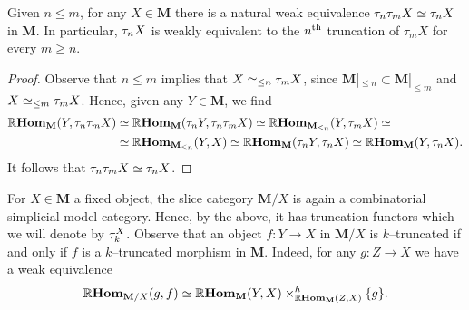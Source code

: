 \begin{corollary}
  Given \(n \leq m\), for any \(X\in\mathbf M\) there is a natural weak equivalence \(\tau_{n}\tau_{m} X \simeq \tau_{n} X\) in \(\mathbf M\). In particular, \(\tau_{n}X\) is weakly equivalent to the \(n\textsuperscript{th}\) truncation of \(\tau_{m}X\) for every \(m\geq n\).
\end{corollary}
\begin{proof}
  Observe that \(n\leq m\) implies that \(X \simeq_{\leq n}\tau_{m}X\), since \(\mathbf M|_{\leq n}\subset \mathbf M|_{\leq m}\) and \(X\simeq_{\leq m}\tau_{m}X\). Hence, given any \(Y\in\mathbf M\), we find
  \begin{align*}
    \operatorname{\mathbb{R}\textnormal{\bfseries Hom}}_{\mathbf M}(Y, \tau_{n}\tau_{m} X)&\simeq \operatorname{\mathbb{R}\textnormal{\bfseries Hom}}_{\mathbf M}(\tau_{n}Y, \tau_{n}\tau_{m}X)\simeq \operatorname{\mathbb{R}\textnormal{\bfseries Hom}}_{\mathbf M_{\leq n}}(Y, \tau_{m}X)\simeq \\
    &\simeq \operatorname{\mathbb{R}\textnormal{\bfseries Hom}}_{\mathbf M_{\leq n}}(Y, X) \simeq \operatorname{\mathbb{R}\textnormal{\bfseries Hom}}_{\mathbf M}(\tau_{n}Y, \tau_{n}X)\simeq \operatorname{\mathbb{R}\textnormal{\bfseries Hom}}_{\mathbf M}(Y, \tau_{n}X).
  \end{align*}
  It follows that \(\tau_{n}\tau_{m}X\simeq \tau_{n}X\).
\end{proof}

For \(X\in\mathbf{M}\) a fixed object, the slice category \(\mathbf M/X\) is again a combinatorial simplicial model category. Hence, by the above, it has truncation functors which we will denote by \(\tau_{k}^{X}\). Observe that an object \(f\colon Y\to X\) in \(\mathbf M/X\) is \(k\)--truncated if and only if \(f\) is a \(k\)--truncated morphism in \(\mathbf M\). Indeed, for any \(g\colon Z\to X\) we have a weak equivalence
\[\operatorname{\mathbb{R}\textnormal{\bfseries Hom}}_{\mathbf M/X}(g, f)\simeq \operatorname{\mathbb{R}\textnormal{\bfseries Hom}}_{\mathbf M}(Y, X)\times^{h}_{\operatorname{\mathbb{R}\textnormal{\bfseries Hom}}_{\mathbf M}(Z, X)} \{g\}.\]

